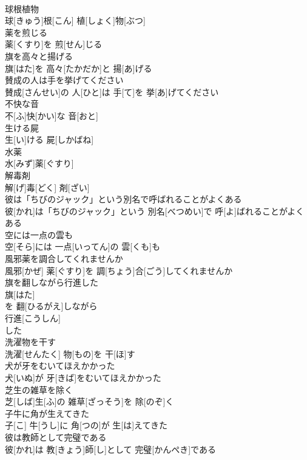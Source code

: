 \documentclass[8pt]{extreport}
\begin{document}
\begin{CJK}{UTF8}{min}
\\	球根植物	
\\	球[きゅう]根[こん] 植[しょく]物[ぶつ]
\\	薬を煎じる	
\\	薬[くすり]を 煎[せん]じる
\\	旗を高々と揚げる	
\\	旗[はた]を 高々[たかだか]と 揚[あ]げる
\\	賛成の人は手を挙げてください	
\\	賛成[さんせい]の 人[ひと]は 手[て]を 挙[あ]げてください
\\	不快な音	
\\	不[ふ]快[かい]な 音[おと]
\\	生ける屍	
\\	生[い]ける 屍[しかばね]
\\	水薬	
\\	水[みず]薬[ぐすり]
\\	解毒剤	
\\	解[げ]毒[どく] 剤[ざい]
\\	彼は「ちびのジャック」という別名で呼ばれることがよくある	
\\	彼[かれ]は「ちびのジャック」という 別名[べつめい]で 呼[よ]ばれることがよくある
\\	空には一点の雲も	
\\	空[そら]には 一点[いってん]の 雲[くも]も
\\	風邪薬を調合してくれませんか	
\\	風邪[かぜ] 薬[ぐすり]を 調[ちょう]合[ごう]してくれませんか
\\	旗を翻しながら行進した	
\\	旗[はた] 
\\	を 翻[ひるがえ]しながら 
\\	行進[こうしん] 
\\	した 
\\	洗濯物を干す	
\\	洗濯[せんたく] 物[もの]を 干[ほ]す
\\	犬が牙をむいてほえかかった	
\\	犬[いぬ]が 牙[きば]をむいてほえかかった
\\	芝生の雑草を除く	
\\	芝[しば]生[ふ]の 雑草[ざっそう]を 除[のぞ]く
\\	子牛に角が生えてきた	
\\	子[こ] 牛[うし]に 角[つの]が 生[は]えてきた
\\	彼は教師として完璧である	
\\	彼[かれ]は 教[きょう]師[し]として 完璧[かんぺき]である

\end{CJK}
\end{document}
